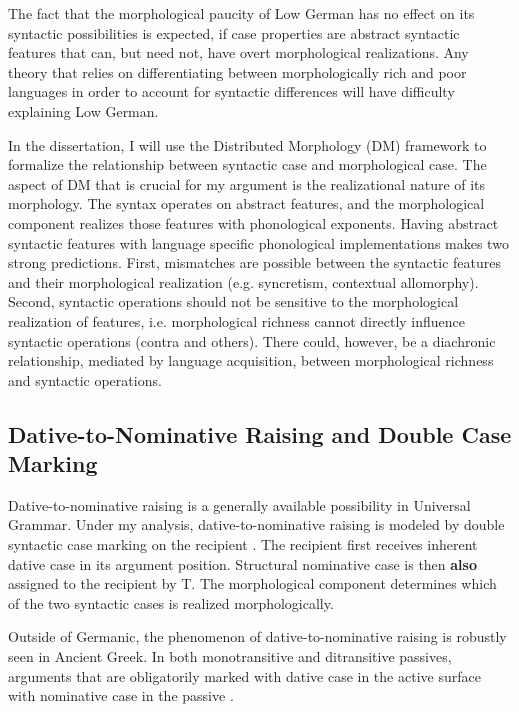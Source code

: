 The fact that the morphological paucity of Low German has no effect on its syntactic possibilities is expected, if case properties are abstract syntactic features that can, but need not, have overt morphological realizations. Any theory that relies on differentiating between morphologically rich and poor languages in order to account for syntactic differences will have difficulty explaining Low German.

In the dissertation, I will use the Distributed Morphology (DM) framework \citep{Halle.1993} to formalize the relationship between syntactic case and morphological case. The aspect of DM that is crucial for my argument is the realizational nature of its morphology. The syntax operates on abstract features, and the morphological component realizes those features with phonological exponents. Having abstract syntactic features with language specific phonological implementations makes two strong predictions. First, mismatches are possible between the syntactic features and their morphological realization (e.g. syncretism, contextual allomorphy). Second, syntactic operations should not be sensitive to the morphological realization of features, i.e. morphological richness cannot directly influence syntactic operations (contra \citep{Holmberg.1995,Weerman.1997,Platzack.2005} and others). There could, however, be a diachronic relationship, mediated by language acquisition, between morphological richness and syntactic operations.


\subsection{Dative-to-Nominative Raising and Double Case Marking}\label{sec:dattonom}
Dative-to-nominative raising is a generally available possibility in Universal Grammar. Under my analysis, dative-to-nominative raising is modeled by double syntactic case marking on the recipient \citep{Merchant.2006}. The recipient first receives inherent dative case in its argument position. Structural nominative case is then \textbf{also} assigned to the recipient by T. The morphological component determines which of the two syntactic cases is realized morphologically. 

Outside of Germanic, the phenomenon of dative-to-nominative raising is robustly seen in Ancient Greek. In both monotransitive and ditransitive passives, arguments that are obligatorily marked with dative case in the active surface with nominative case in the passive \citep{Smyth.1956,Alexiadou.2013,Alexiadou.2013b,Kiparsky.2013}.

